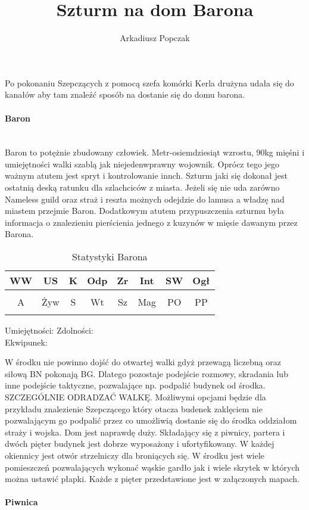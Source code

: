 \documentclass{article}
\title{\Huge{Szturm na dom Barona}}
\author{Arkadiusz Popczak}
\newcommand{\whtable}[1]{
    \begin{table}[H]
        \caption{{#1}}
        \vspace{4pt}
        \centering
            \begin{tabular}{|c|c|c|c|c|c|c|c|}
                \hline
                WW & US & K & Odp & Zr & Int & SW & Ogł \\ \hline
                 &  &  &  &  &  &  &  \\ \hline
                A & Żyw & S & Wt & Sz & Mag & PO & PP \\ \hline
                 &  &  &  &  &  &  &  \\ \hline
                \end{tabular}
    \end{table}

    \noindent
    Umiejętności:
    \hspace{150pt}
    Zdolności:
    \vspace{50pt}\\
    Ekwipunek:
    \vspace{50pt}
}
\begin{document}
\maketitle

Po pokonaniu Szepczących z pomocą szefa komórki Kerla drużyna udała się do kanałów aby tam znaleźć sposób na dostanie się do domu barona. \\
\paragraph{\Large{Baron}}\mbox{}\\

\indent
Baron to potężnie zbudowany człowiek. Metr-osiemdziesiąt wzrostu, 90kg mięśni i umiejętności walki szablą jak niejedenwprawny wojownik. Oprócz tego jego ważnym atutem jest spryt i kontrolowanie innch. Szturm jaki się dokonał jest ostatnią deską ratunku dla szlachciców z miasta. Jeżeli się nie uda zarówno Nameless guild oraz straż i reszta możnych odejdzie do lamusa a władzę nad miastem przejmie Baron. Dodatkowym atutem przypuszczenia szturmu była informacja o znalezieniu pierścienia jednego z kuzynów w mięsie dawanym przez Barona.

\whtable{Statystyki Barona}

W środku nie powinno dojść do otwartej walki gdyż przewagą liczebną oraz siłową BN pokonają BG. Dlatego pozostaje podejście rozmowy, skradania lub inne podejście taktyczne, pozwalające np. podpalić budynek od środka. SZCZEGÓLNIE ODRADZAĆ WALKĘ. Możliwymi opcjami będzie dla przykładu znalezienie Szepczącego który otacza budenek zaklęciem nie pozwalającym go podpalić przez co umożliwią dostanie się do środka oddziałom straży i wojska. Dom jest naprawdę duży. Składający się z piwnicy, partera i dwóch pięter budynek jest dobrze wyposażony i ufortyfikowany. W każdej okiennicy jest otwór strzelniczy dla broniących się. W środku jest wiele pomieszczeń pozwalających wykonać wąskie gardło jak i wiele skrytek w których można ustawić płapki. Każde z pięter przedstawione jest w załączonych mapach. 

\pagebreak
\paragraph{\Large{Piwnica}}\mbox{}\\
\end{document}
